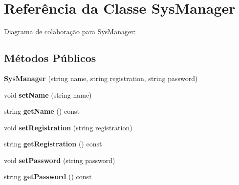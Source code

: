 \hypertarget{classSysManager}{}\section{Referência da Classe Sys\+Manager}
\label{classSysManager}


Diagrama de colaboração para Sys\+Manager\+:
\subsection*{Métodos Públicos}
\begin{DoxyCompactItemize}
\item 
{\bfseries Sys\+Manager} (string name, string registration, string password)\hypertarget{classSysManager_abbe5a799099f4b582cf5c4cb8bbf3172}{}\label{classSysManager_abbe5a799099f4b582cf5c4cb8bbf3172}

\item 
void {\bfseries set\+Name} (string name)\hypertarget{classSysManager_acc57bbeb9af7e909baf2bc100eb5ebe6}{}\label{classSysManager_acc57bbeb9af7e909baf2bc100eb5ebe6}

\item 
string {\bfseries get\+Name} () const \hypertarget{classSysManager_a94ab81dcb1f2253c329da642e2d83d3b}{}\label{classSysManager_a94ab81dcb1f2253c329da642e2d83d3b}

\item 
void {\bfseries set\+Registration} (string registration)\hypertarget{classSysManager_a451cd3013877643ee0dcb433fc2cbd1e}{}\label{classSysManager_a451cd3013877643ee0dcb433fc2cbd1e}

\item 
string {\bfseries get\+Registration} () const \hypertarget{classSysManager_af4fee1eb3299c4dd7ba1e4996c222ffc}{}\label{classSysManager_af4fee1eb3299c4dd7ba1e4996c222ffc}

\item 
void {\bfseries set\+Password} (string password)\hypertarget{classSysManager_aa595f7d75b0b3650e0deb5735b4c8ab5}{}\label{classSysManager_aa595f7d75b0b3650e0deb5735b4c8ab5}

\item 
string {\bfseries get\+Password} () const \hypertarget{classSysManager_a27e28c1cb065e1e5b5a88f73334a7323}{}\label{classSysManager_a27e28c1cb065e1e5b5a88f73334a7323}

\end{DoxyCompactItemize}
